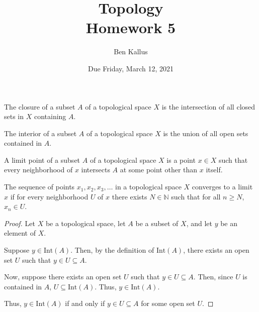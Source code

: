 \documentclass{article}
\date{Due Friday, March 12, 2021}
\author{Ben Kallus}
\title{Topology \\ Homework 5}
\newcommand{\N}{\mathbb N}
\begin{document}
\pagecolor{black}
\color{white}
\maketitle


    The closure of a subset $A$ of a topological space $X$ is the intersection of all closed sets in $X$ containing $A$.

\medskip{}

    The interior of a subset $A$ of a topological space $X$ is the union of all open sets contained in $A$.

\medskip{}

    A limit point of a subset $A$ of a topological space $X$ is a point $x \in X$ such that every neighborhood of $x$ intersects $A$ at some point other than $x$ itself.

\medskip{}

    The sequence of points $x_1, x_2, x_3, \hdots$ in a topological space $X$ converges to a limit $x$ if for every neighborhood $U$ of $x$ there exists $N \in \N$ such that for all $n \geq N$, $x_n \in U$.

\newpage{}
\begin{proof}
    Let $X$ be a topological space, let $A$ be a subset of $X$, and let $y$ be an element of $X$.

    Suppose $y \in \text{Int}(A)$.
    Then, by the definition of $\text{Int}(A)$, there exists an open set $U$ such that $y \in U \subseteq A$.

    Now, suppose there exists an open set $U$ such that $y \in U \subseteq A$.
    Then, since $U$ is contained in $A$, $U \subseteq \text{Int}(A)$.
    Thus, $y \in \text{Int}(A)$.

    Thus, $y \in \text{Int}(A)$ if and only if $y \in U \subseteq A$ for some open set $U$.
\end{proof}
\end{document}
